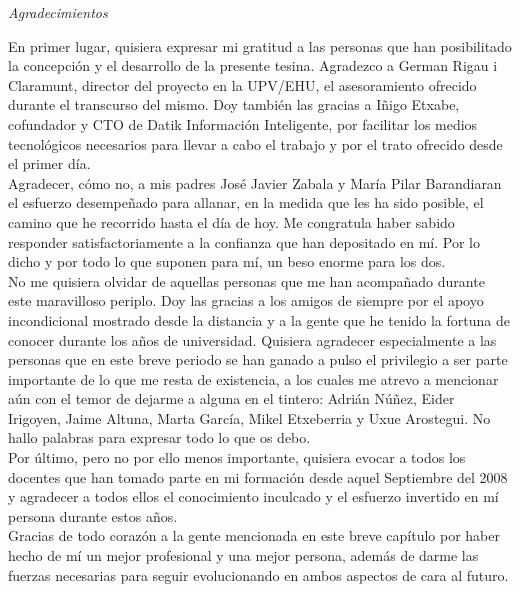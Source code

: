 \begin{flushright}
	\Large\textit{Agradecimientos}
\end{flushright}

En primer lugar, quisiera expresar mi gratitud a las personas que han posibilitado la concepción y el desarrollo de la presente tesina. Agradezco a German Rigau i Claramunt, director del proyecto en la UPV/EHU, el asesoramiento ofrecido durante el transcurso del mismo. Doy también las gracias a Iñigo Etxabe, cofundador y CTO de Datik Información Inteligente, por facilitar los medios tecnológicos necesarios para llevar a cabo el trabajo y por el trato ofrecido desde el primer día.\\

Agradecer, cómo no, a mis padres José Javier Zabala y María Pilar Barandiaran el esfuerzo desempeñado para allanar, en la medida que les ha sido posible, el camino que he recorrido hasta el día de hoy. Me congratula haber sabido responder satisfactoriamente a la confianza que han depositado en mí. Por lo dicho y por todo lo que suponen para mí, un beso enorme para los dos.\\

No me quisiera olvidar de aquellas personas que me han acompañado durante este maravilloso periplo. Doy las gracias a los amigos de siempre por el apoyo incondicional mostrado desde la distancia y a la gente que he tenido la fortuna de conocer durante los años de universidad. Quisiera agradecer especialmente a las personas que en este breve periodo se han ganado a pulso el privilegio a ser parte importante de lo que me resta de existencia, a los cuales me atrevo a mencionar aún con el temor de dejarme a alguna en el tintero: Adrián Núñez, Eider Irigoyen, Jaime Altuna, Marta García, Mikel Etxeberria y Uxue Arostegui. No hallo palabras para expresar todo lo que os debo.\\

Por último, pero no por ello menos importante, quisiera evocar a todos los docentes que han tomado parte en mi formación desde aquel Septiembre del 2008 y agradecer a todos ellos el conocimiento inculcado y el esfuerzo invertido en mí persona durante estos años.\\

Gracias de todo corazón a la gente mencionada en este breve capítulo por haber hecho de mí un mejor profesional y una mejor persona, además de darme las fuerzas necesarias para seguir evolucionando en ambos aspectos de cara al futuro.\\

